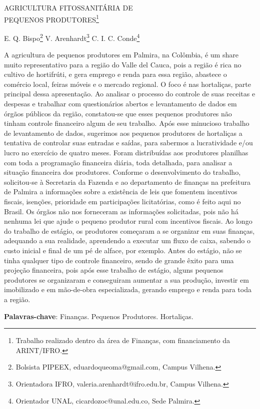 \documentclass[article,12pt,onesidea,4paper,english,brazil]{abntex2}
\begin{document}
	
	
	\frenchspacing 
	
	\begin{center}
		\LARGE AGRICULTURA FITOSSANITÁRIA DE\\PEQUENOS PRODUTORES\footnote{Trabalho realizado dentro da área de Finanças, com financiamento da ARINT/IFRO.}
		
		\normalsize
		E. Q. Bispo\footnote{Bolsista PIPEEX, eduardoqueoma@gmail.com, Campus Vilhena.} 
		V. Arenhardt\footnote{Orientadora IFRO, valeria.arenhardt@ifro.edu.br, Campus Vilhena.} 
		C. I. C. Conde\footnote{Orientador UNAL, cicardozoc@unal.edu.co, Sede Palmira.} 
	\end{center}
	
	\noindent A agricultura de pequenos produtores em Palmira, na Colômbia, é um share muito representativo para a região do Valle del Cauca, pois a região é rica no cultivo de hortifrúti, e gera emprego e renda para essa região, abastece o comércio local, feiras móveis e o mercado regional. O foco é nas hortaliças, parte principal dessa apresentação. Ao analisar o processo do controle de suas receitas e despesas e trabalhar com questionários abertos e levantamento de dados em órgãos públicos da região, constatou-se que esses pequenos produtores não tinham controle financeiro algum de seu trabalho. Após esse minucioso trabalho de levantamento de dados, sugerimos aos pequenos produtores de hortaliças a tentativa de controlar suas entradas e saídas, para sabermos a lucratividade e/ou lucro no exercício de quatro meses. Foram distribuídas aos produtores planilhas com toda a programação financeira diária, toda detalhada, para analisar a situação financeira dos produtores. Conforme o desenvolvimento do trabalho, solicitou-se à Secretaria da Fazenda e ao departamento de finanças na prefeitura de Palmira a informações sobre a existência de leis que fomentem incentivos fiscais, isenções, prioridade em participações licitatórias, como é feito aqui no Brasil. Os órgãos não nos forneceram as informações solicitadas, pois não há nenhuma lei que ajude o pequeno produtor rural com incentivos fiscais. Ao longo do trabalho de estágio, os produtores começaram a se organizar em suas finanças, adequando a sua realidade, aprendendo a executar um fluxo de caixa, sabendo o custo inicial e final de um pé de alface, por exemplo. Antes do estágio, não se tinha qualquer tipo de controle financeiro, sendo de grande êxito para uma projeção financeira, pois após esse trabalho de estágio, alguns pequenos produtores se organizaram e conseguiram aumentar a sua produção, investir em imobilizado e em mão-de-obra especializada, gerando emprego e renda para toda a região.
	
	\vspace{\onelineskip}
	
	\noindent
	\textbf{Palavras-chave}: Finanças. Pequenos Produtores. Hortaliças.
	
\end{document}

